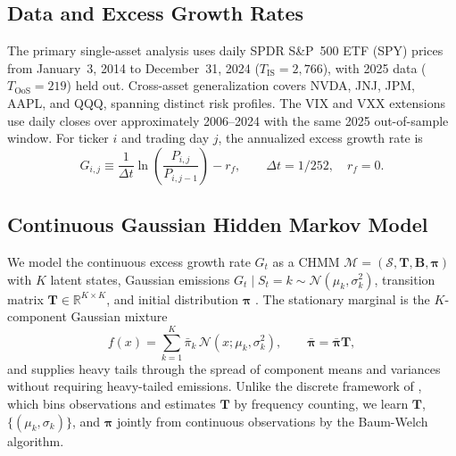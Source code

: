 \subsection{Data and Excess Growth Rates}
\label{sec:data}

The primary single-asset analysis uses daily SPDR S\&P~500 ETF (SPY) prices from January~3, 2014 to December~31, 2024 ($T_{\text{IS}} = 2{,}766$), with 2025 data ($T_{\text{OoS}} = 219$) held out.
Cross-asset generalization covers NVDA, JNJ, JPM, AAPL, and QQQ, spanning distinct risk profiles.
The VIX and VXX extensions use daily closes over approximately 2006--2024 with the same 2025 out-of-sample window.
For ticker $i$ and trading day $j$, the annualized excess growth rate is
\begin{equation}
    G_{i,j} \equiv \frac{1}{\Delta t} \ln\!\left(\frac{P_{i,j}}{P_{i,j-1}}\right) - r_f,
    \qquad \Delta t = 1/252, \quad r_f = 0.
    \label{eq:growth_rate}
\end{equation}

\subsection{Continuous Gaussian Hidden Markov Model}
\label{sec:chmm_def}

We model the continuous excess growth rate $G_t$ as a CHMM $\mathcal{M} = (\mathcal{S}, \mathbf{T}, \mathbf{B}, \boldsymbol{\pi})$ with $K$ latent states, Gaussian emissions $G_t \mid S_t = k \sim \mathcal{N}(\mu_k, \sigma_k^2)$, transition matrix $\mathbf{T} \in \mathbb{R}^{K \times K}$, and initial distribution $\boldsymbol{\pi}$ \cite{rabiner1986introduction}.
The stationary marginal is the $K$-component Gaussian mixture
\begin{equation}
    f(x) = \sum_{k=1}^{K} \bar{\pi}_k\, \mathcal{N}(x; \mu_k, \sigma_k^2),
    \qquad \bar{\boldsymbol{\pi}} = \bar{\boldsymbol{\pi}} \mathbf{T},
    \label{eq:mixture}
\end{equation}
and supplies heavy tails through the spread of component means and variances without requiring heavy-tailed emissions.
Unlike the discrete framework of \citet{alswaidan2026hybrid}, which bins observations and estimates $\mathbf{T}$ by frequency counting, we learn $\mathbf{T}$, $\{(\mu_k, \sigma_k)\}$, and $\boldsymbol{\pi}$ jointly from continuous observations by the Baum-Welch algorithm.

